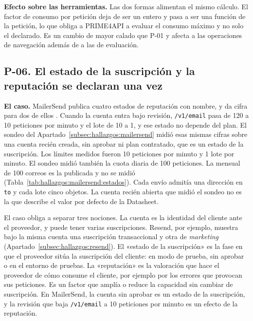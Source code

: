 \textbf{Efecto sobre las herramientas.} Las dos formas alimentan el mismo cálculo.
El factor de consumo por petición deja de ser un entero y pasa a ser una función
de la petición, lo que obliga a PRIME4API a evaluar el consumo máximo y no solo el
declarado. Es un cambio de mayor calado que P-01 y afecta a las operaciones de
navegación además de a las de evaluación.

\subsection{P-06. El estado de la suscripción y la reputación se declaran una vez}
\label{subsec:evolucion:p06}

\textbf{El caso.} MailerSend publica cuatro estados de reputación con nombre, y da cifra para dos de ellos \citep{mailersenddocs}.
Cuando la cuenta entra bajo revisión, \texttt{/v1/email} pasa de 120 a 10 peticiones por minuto y el lote de 10 a 1, y ese estado no depende del plan.
El sondeo del Apartado~\ref{subsec:hallazgos:mailersend} midió esas mismas cifras sobre una cuenta recién creada, sin aprobar ni plan contratado, que es un estado de la suscripción.
Los límites medidos fueron 10 peticiones por minuto y 1 lote por minuto.
El sondeo midió también la cuota diaria de 100 peticiones.
La mensual de 100 correos es la publicada y no se midió (Tabla~\ref{tab:hallazgos:mailersend:estados}).
Cada envío admitía una dirección en \texttt{to} y cada lote cinco objetos.
La cuenta recién abierta que midió el sondeo no es la que describe el valor por defecto de la Datasheet.

El caso obliga a separar tres nociones.
La cuenta es la identidad del cliente ante el proveedor, y puede tener varias suscripciones.
Resend, por ejemplo, muestra bajo la misma cuenta una suscripción transaccional y otra de \textit{marketing} (Apartado~\ref{subsec:hallazgos:resend}).
El «estado de la suscripción» es la fase en que el proveedor sitúa la suscripción del cliente: en modo de prueba, sin aprobar o en el entorno de pruebas.
La «reputación» es la valoración que hace el proveedor de cómo consume el cliente, por ejemplo por los errores que provocan sus peticiones.
Es un factor que amplía o reduce la capacidad sin cambiar de suscripción.
En MailerSend, la cuenta sin aprobar es un estado de la suscripción, y la revisión que baja \texttt{/v1/email} a 10 peticiones por minuto es un efecto de la reputación.

